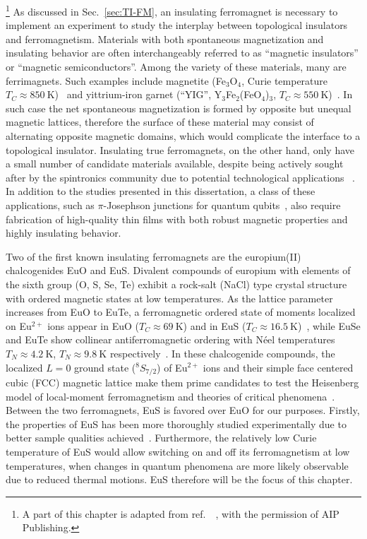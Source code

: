 \footnote[2]{A part of this chapter is adapted from ref.~\cite{EuS_PLD}~, with the permission of AIP Publishing.}%
As discussed in Sec.~\ref{sec:TI-FM}, an insulating ferromagnet is necessary to implement an experiment to study the interplay between topological insulators and ferromagnetism. Materials with both spontaneous magnetization and insulating behavior are often interchangeably referred to as ``magnetic insulators'' or ``magnetic semiconductors''. Among the variety of these materials, many are ferrimagnets. Such examples include magnetite (Fe$_3$O$_4$, Curie temperature $T_C\approx850~\mathrm{K}$)~\cite{Neel1948} and yittrium-iron garnet (``YIG'', Y$_3$Fe$_2$(FeO$_4$)$_3$, $T_C\approx550~\mathrm{K}$)~\cite{YIG}. In such case the net spontaneous magnetization is formed by opposite but unequal magnetic lattices, therefore the surface of these material may consist of alternating opposite magnetic domains, which would complicate the interface to a topological insulator. Insulating true ferromagnets, on the other hand, only have a small number of candidate materials available, despite being actively sought after by the spintronics community due to potential technological applications \cite[][p.~329]{kittel}~\cite{Yi2014, Wolf2001, EuS_spin_filter, EuS_app1, EuS_spin_filter2}. In addition to the studies presented in this dissertation, a class of these applications, such as $\pi$-Josephson junctions for quantum qubits~\cite{pi_qubit, pi_junction, Jing}, also require fabrication of high-quality thin films with both robust magnetic properties and highly insulating behavior.

Two of the first known insulating ferromagnets are the europium(II) chalcogenides EuO and EuS. Divalent compounds of europium with elements of the sixth group (O, S, Se, Te) exhibit a rock-salt (NaCl) type crystal structure with ordered magnetic states at low temperatures. As the lattice parameter increases from EuO to EuTe, a ferromagnetic ordered state of moments localized on Eu$^{2+}$ ions appear in EuO ($T_C\approx69~\mathrm{K}$) and in EuS ($T_C\approx16.5~\mathrm{K}$)~\cite{EuO_TC, EuS_Shafer, EuS_specific_heat}, while EuSe and EuTe show collinear antiferromagnetic ordering with N\'eel temperatures $T_N\approx4.2~\mathrm{K}$, $T_N\approx9.8~\mathrm{K}$ respectively~\cite{EuSe_AF, EuTe_AF}. In these chalcogenide compounds, the localized $L=0$ ground state ($^8S_{7/2}$) of Eu$^{2+}$ ions and their simple face centered cubic (FCC) magnetic lattice make them prime candidates to test the Heisenberg model of local-moment ferromagnetism and theories of critical phenomena~\cite{divalent_Eu, EuX_indirect_exchange, EuS_neighbor_exchange, EuS_critical, EuS_neutron, EuS_spin_wave}. Between the two ferromagnets, EuS is favored over EuO for our purposes. Firstly, the properties of EuS has been more thoroughly studied experimentally due to better sample qualities achieved~\cite{EuS_band_th2}. Furthermore, the relatively low Curie temperature of EuS would allow switching on and off its ferromagnetism at low temperatures, when changes in quantum phenomena are more likely observable due to reduced thermal motions. EuS therefore will be the focus of this chapter.


